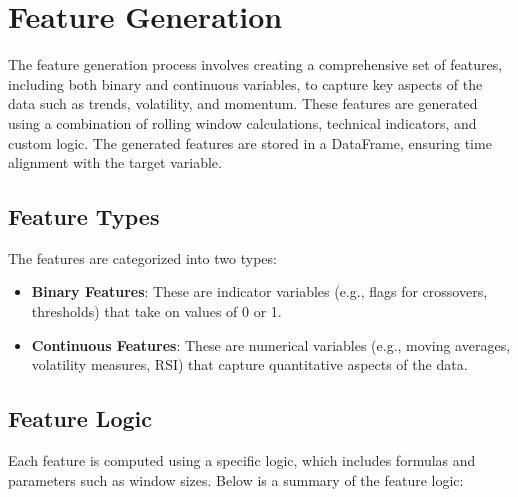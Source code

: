 \documentclass[11pt]{article}
\begin{document}
\section{Feature Generation}
The feature generation process involves creating a comprehensive set of features, including both binary and continuous variables, to capture key aspects of the data such as trends, volatility, and momentum. These features are generated using a combination of rolling window calculations, technical indicators, and custom logic. The generated features are stored in a DataFrame, ensuring time alignment with the target variable.


\subsection*{Feature Types}
The features are categorized into two types:
\begin{itemize}
    \item \textbf{Binary Features}: These are indicator variables (e.g., flags for crossovers, thresholds) that take on values of 0 or 1.
    \item \textbf{Continuous Features}: These are numerical variables (e.g., moving averages, volatility measures, RSI) that capture quantitative aspects of the data.
\end{itemize}

\subsection*{Feature Logic}
Each feature is computed using a specific logic, which includes formulas and parameters such as window sizes. Below is a summary of the feature logic:
\end{document}
